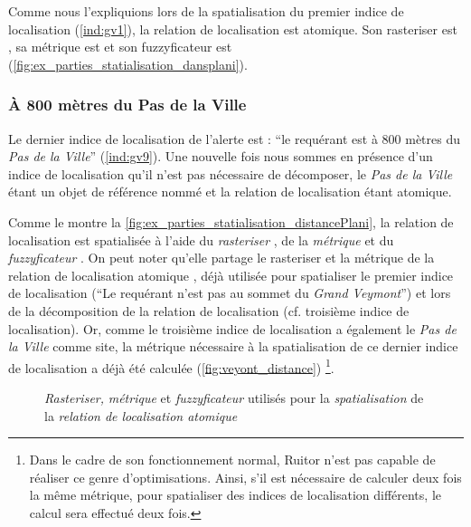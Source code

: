 Comme nous l’expliquions lors de la spatialisation du premier indice
de localisation (\ref{ind:gv1}), la relation de localisation
 est atomique. Son rasteriser est
, sa métrique est  et son
fuzzyficateur est 
(\autoref{fig:ex_parties_statialisation_dansplani}).





\subsubsection{À 800 mètres du Pas de la Ville}

Le dernier indice de localisation de l'alerte est : \enquote{le
  requérant est à 800 mètres du \emph{Pas de la Ville}}
(\ref{ind:gv9}). Une nouvelle fois nous sommes en présence d'un indice
de localisation qu'il n'est pas nécessaire de décomposer, le \emph{Pas
  de la Ville} étant un objet de référence nommé et la relation de
localisation  étant
atomique.

Comme le montre la
\autoref{fig:ex_parties_statialisation_distancePlani}, la relation de
localisation  est
spatialisée à l'aide du \emph{rasteriser} , de
la \emph{métrique}  et du
\emph{fuzzyficateur} . On peut noter qu'elle
partage le rasteriser et la métrique de la relation de localisation
atomique , déjà utilisée pour
spatialiser le premier indice de localisation (\enquote{Le requérant
  n'est pas au sommet du \emph{Grand Veymont}}) et lors de la
décomposition de la relation de localisation
 (cf. troisième indice de
localisation). Or, comme le troisième indice de localisation a
également le \emph{Pas de la Ville} comme site, la métrique nécessaire
à la spatialisation de ce dernier indice de localisation a déjà été
calculée (\autoref{fig:veyont_distance}) \footnote{Dans le cadre de
  son fonctionnement normal, Ruitor n'est pas capable de réaliser ce
  genre d'optimisations. Ainsi, s'il est nécessaire de calculer deux
  fois la même métrique, pour spatialiser des indices de localisation
  différents, le calcul sera effectué deux fois.}.

\begin{figure}
  \centering
  
  \caption{\emph{Rasteriser,} \emph{métrique} et \emph{fuzzyficateur}
    utilisés pour la \emph{spatialisation} de la \emph{relation de
      localisation atomique}
    \protect{}}
  \label{fig:ex_parties_statialisation_distancePlani}
\end{figure}

